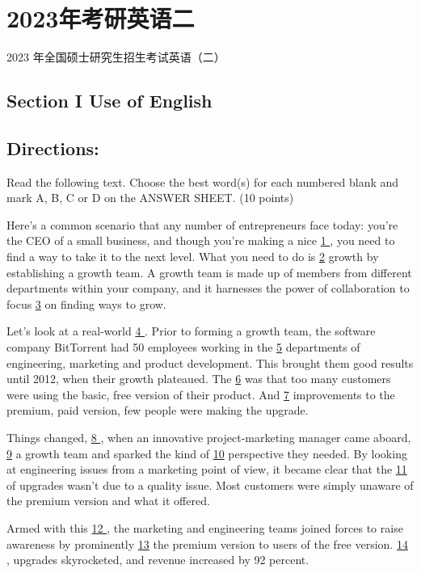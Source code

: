 \documentclass[UTF8,11pt]{ctexart}
\begin{document}
\section*{2023年考研英语二}
2023 年全国硕士研究生招生考试英语（二）


\subsection*{\textbf{Section I Use of English}}


\subsection*{\textbf{Directions:}}


Read the following text. Choose the best word(s) for each numbered blank and mark A, B, C or D on the ANSWER SHEET. (10 points)


Here’s a common scenario that any number of entrepreneurs face today: you’re the CEO of a small business, and though you’re making a nice \uline{1 }, you need to find a way to take it to the next level. What you need to do is \uline{2} growth by establishing a growth team. A growth team is made up of members from different departments within your company, and it harnesses the power of collaboration to focus \uline{3} on finding ways to grow.


Let’s look at a real-world \uline{4 }. Prior to forming a growth team, the software company BitTorrent had 50 employees working in the \uline{5} departments of engineering, marketing and product development. This brought them good results until 2012, when their growth plateaued. The \uline{6} was that too many customers were using the basic, free version of their product. And \uline{7} improvements to the premium, paid version, few people were making the upgrade.


Things changed, \uline{8 }, when an innovative project-marketing manager came aboard, \uline{9} a growth team and sparked the kind of \uline{10} perspective they needed. By looking at engineering issues from a marketing point of view, it became clear that the \uline{11} of upgrades wasn’t due to a quality issue. Most customers were simply unaware of the premium version and what it offered.


Armed with this \uline{12 }, the marketing and engineering teams joined forces to raise awareness by prominently \uline{13} the premium version to users of the free version. \uline{14 }, upgrades skyrocketed, and revenue increased by 92 percent.
\end{document}
